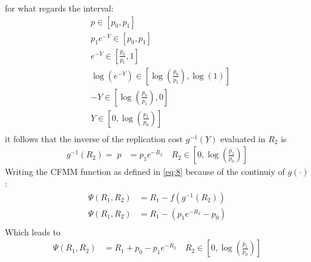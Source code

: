 \documentclass[12pt]{article}
\begin{document}
for what regards the interval:
\begin{align*}
     & p\in[p_0,p_1]                                                          \\
     & p_1e^{-Y}\in [p_0,p_1]                                                 \\
     & e^{-Y}\in \left[\frac{p_0}{p_1},1\right]                               \\
     & \log(e^{-Y})\in \left[\log\left(\frac{p_0}{p_1}\right), \log(1)\right] \\
     & -Y \in \left[\log\left(\frac{p_0}{p_1}\right), 0\right]                \\
     & Y \in \left[0,\log\left(\frac{p_1}{p_0}\right)\right]                  \\
\end{align*}
it follows that the inverse of the replication cost $g^{-1}(Y)$ evaluated in $R_2$ is
\begin{align*}
    g^{-1}(R_2)=\;p & = p_1e^{-R_2} \quad R_2\in \left[0,\log\left(\frac{p_1}{p_0}\right)\right]
\end{align*}
Writing the CFMM function as defined in \eqref{eq:8} because of the continuiy of $g(\cdot)$:
\begin{align*}
    \Psi(R_1,R_2) & = R_1 - f(g^{-1}(R_2))    \\
    \Psi(R_1,R_2) & = R_1 - (p_1e^{-R_2}-p_0) \\
\end{align*}
Which leads to
\begin{align*}
    \Psi(R_1,R_2) & = R_1 +p_0 -p_1e^{-R_2} \quad R_2\in \left[0,\log\left(\frac{p_1}{p_0}\right)\right]
\end{align*}
\newpage
\end{document}
